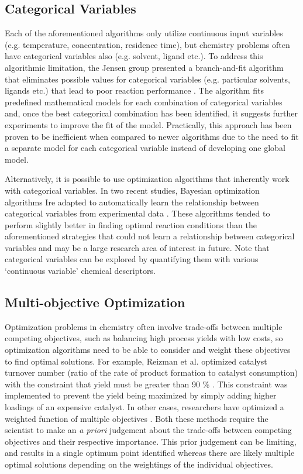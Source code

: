 \subsection{Categorical Variables}
Each of the aforementioned algorithms only utilize continuous input variables (e.g. temperature, concentration, residence time), but chemistry problems often have categorical variables also (e.g. solvent, ligand etc.). To address this algorithmic limitation, the Jensen group presented a branch-and-fit algorithm that eliminates possible values for categorical variables (e.g. particular solvents, ligands etc.) that lead to poor reaction performance \cite{Reizman2016a, Baumgartner2018}. The algorithm fits predefined mathematical models for each combination of categorical variables and, once the best categorical combination has been identified, it suggests further experiments to improve the fit of the model. Practically, this approach has been proven to be inefficient when compared to newer algorithms due to the need to fit a separate model for each categorical variable instead of developing one global model.

Alternatively, it is possible to use optimization algorithms that inherently work with categorical variables. In two recent studies, Bayesian optimization algorithms Ire adapted to automatically learn the relationship between categorical variables from experimental data \cite{Manson2021, Hase2021}. These algorithms tended to perform slightly better in finding optimal reaction conditions than the aforementioned strategies that could not learn a relationship between categorical variables and may be a large research area of interest in future. Note that categorical variables can be explored by quantifying them with various ‘continuous variable’ chemical descriptors.

\subsection{Multi-objective Optimization}
Optimization problems in chemistry often involve trade-offs between multiple competing objectives, such as balancing high process yields with low costs, so optimization algorithms need to be able to consider and weight these objectives to find optimal solutions. For example, Reizman et al. optimized catalyst turnover number (ratio of the rate of product formation to catalyst consumption) with the constraint that yield must be greater than 90 \% \cite{Reizman2015b, Reizman2016a, Reizman2016b, Baumgartner2018}. This constraint was implemented to prevent the yield being maximized by simply adding higher loadings of an expensive catalyst. In other cases, researchers have optimized a weighted function of multiple objectives \cite{Krishnadasan2007, Fitzpatrick2016, Hase2018b}. Both these methods require the scientist to make an \textit{a priori} judgement about the trade-offs between competing objectives and their respective importance. This prior judgement can be limiting, and results in a single optimum point identified whereas there are likely multiple optimal solutions depending on the weightings of the individual objectives.

